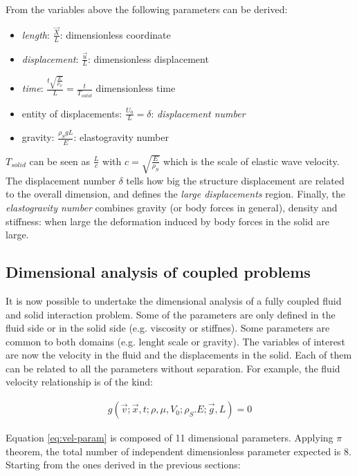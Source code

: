 From the variables above the following parameters can be derived:

\begin{itemize}
	\item \textit{length}: $\frac{\vec{X}}{L}$: dimensionless coordinate
	\item \textit{displacement}: $\frac{\vec{u}}{L}$: dimensionless displacement
	\item \textit{time}: $\frac{t \sqrt{\frac{E}{\rho_S}}}{L} = \frac{t}{T_{solid}}$ dimensionless time
	\item entity of displacements: $\frac{U_0}{L} = \delta$: \textit{displacement number}
	\item gravity: $\frac{\rho_S g L}{E}$: elastogravity number
\end{itemize}

$T_{solid}$ can be seen as $\frac{L}{c}$ with $c = \sqrt{\frac{E}{\rho_S}}$ which is the scale of elastic wave velocity. The displacement number $\delta$ tells how big the structure displacement are related to the overall dimension, and defines the \textit{large displacements} region.
Finally, the \textit{elastogravity number} combines gravity (or body forces in general), density and stiffness: when large the deformation induced by body forces in the solid are large. 

\subsection{Dimensional analysis of coupled problems}

It is now possible to undertake the dimensional analysis of a fully coupled fluid and solid interaction problem. Some of the parameters are only defined in the fluid side or in the solid side (e.g. viscosity or stiffnes). Some parameters are common to both domains (e.g. lenght scale or gravity). The variables of interest are now the velocity in the fluid and the displacements in the solid. Each of them can be related to all the parameters without separation. For example, the fluid velocity relationship is of the kind:

\begin{eqnarray}
	 g(\vec{v}; \vec{x},t; \rho, \mu, V_0; \rho_S. E; \vec{g}, L) = 0
	 \label{eq:vel-param}
\end{eqnarray}


Equation \ref{eq:vel-param} is composed of 11 dimensional parameters. Applying $\pi$ theorem, the total number of independent dimensionless parameter expected is 8. Starting from the ones derived in the previous sections:

